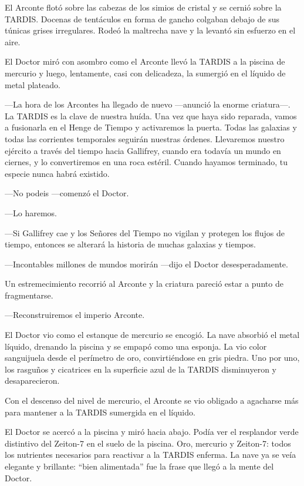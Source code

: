 El Arconte flotó sobre las cabezas de los simios de cristal y se cernió
sobre la TARDIS. Docenas de tentáculos en forma de gancho colgaban
debajo de sus túnicas grises irregulares. Rodeó la maltrecha nave y la
levantó sin esfuerzo en el aire.

El Doctor miró con asombro como el Arconte llevó la TARDIS a la piscina
de mercurio y luego, lentamente, casi con delicadeza, la sumergió en el
líquido de metal plateado.

---La hora de los Arcontes ha llegado de nuevo ---anunció la enorme
criatura---. La TARDIS es la clave de nuestra huída. Una vez que haya
sido reparada, vamos a fusionarla en el Henge de Tiempo y activaremos la
puerta. Todas las galaxias y todas las corrientes temporales seguirán
nuestras órdenes. Llevaremos nuestro ejército a través del tiempo hacia
Gallifrey, cuando era todavía un mundo en ciernes, y lo convertiremos en
una roca estéril. Cuando hayamos terminado, tu especie nunca habrá
existido.

---No podeis ---comenzó el Doctor.

---Lo haremos.

---Si Gallifrey cae y los Señores del Tiempo no vigilan y protegen los
flujos de tiempo, entonces se alterará la historia de muchas galaxias y
tiempos.

---Incontables millones de mundos morirán ---dijo el Doctor
desesperadamente.

Un estremecimiento recorrió al Arconte y la criatura pareció estar a
punto de fragmentarse. 

---Reconstruiremos el imperio Arconte.

El Doctor vio como el estanque de mercurio se encogió. La nave absorbió
el metal líquido, drenando la piscina y se empapó como una esponja. La
vio color sanguijuela desde el perímetro de oro, convirtiéndose en gris
piedra. Uno por uno, los rasguños y cicatrices en la superficie azul
de la TARDIS disminuyeron y desaparecieron.

Con el descenso del nivel de mercurio, el Arconte se vio obligado a
agacharse más para mantener a la TARDIS sumergida en el líquido.

El Doctor se acercó a la piscina y miró hacia abajo. Podía ver el
resplandor verde distintivo del Zeiton-7 en el suelo de la piscina. Oro,
mercurio y Zeiton-7: todos los nutrientes necesarios para reactivar a la
TARDIS enferma. La nave ya se veía elegante y brillante: ``bien
alimentada'' fue la frase que llegó a la mente del Doctor.

